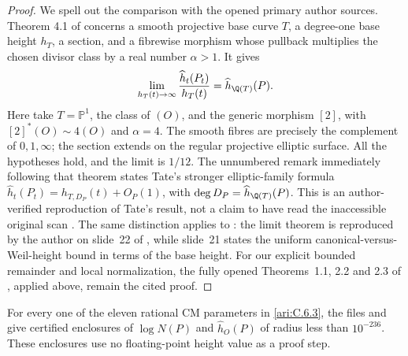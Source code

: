 \begin{proof}
We spell out the comparison with the opened primary author sources.
Theorem 4.1 of \citet[pp.~183--184]{callSilverman1993} concerns a
smooth projective base curve $T$, a degree-one base height $h_T$,
a section, and a fibrewise morphism whose pullback multiplies the
chosen divisor class by a real number $\alpha>1$. It gives
\[
 \lim_{h_T(t)\to\infty}
 \frac{\widehat h_t(P_t)}{h_T(t)}
       =\widehat h_{\Q(T)}(P).
\]
Here take $T=\mathbb P^1$, the class of $(O)$, and the generic
morphism $[2]$, with $[2]^*(O)\sim4(O)$ and $\alpha=4$.
The smooth fibres are precisely the complement of $0,1,\infty$;
the section extends on the regular projective elliptic surface.
All the hypotheses hold, and the limit is $1/12$.
The unnumbered remark immediately following that theorem states
Tate's stronger elliptic-family formula
$\widehat h_t(P_t)=h_{T,D_P}(t)+O_P(1)$, with
$\deg D_P=\widehat h_{\Q(T)}(P)$. This is an author-verified
reproduction of Tate's result, not a claim to have read the
inaccessible original scan \citep{tate1983variation}.
The same distinction applies to \citet{silverman1983specialization}:
the limit theorem is reproduced by the author on slide~22 of
\citet{silverman2006heights}, while slide~21 states the uniform
canonical-versus-Weil-height bound in terms of the base height.
For our explicit bounded remainder and local normalization, the
fully opened Theorems~1.1, 2.2 and 2.3 of
\citet{demarco2017}, applied above, remain the cited proof.
\end{proof}

\begin{proposition}\label{ari:C.6.5}
For every one of the eleven rational CM parameters in \ref{ari:C.6.3},
the files  and
 give certified enclosures of
$\log N(P)$ and $\widehat h_O(P)$ of radius less than
$10^{-236}$. These enclosures use no floating-point height
value as a proof step.
\end{proposition}

